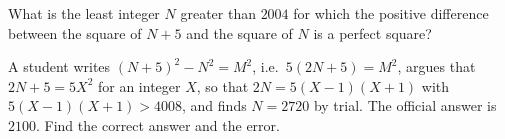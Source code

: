 What is the least integer $N$ greater than $2004$ for which the positive difference between the square of $N+5$ and the square of $N$ is a perfect square?

A student writes $(N+5)^2-N^2=M^2$, i.e.\ $5(2N+5)=M^2$, argues that $2N+5=5X^2$ for an integer $X$, so that $2N=5(X-1)(X+1)$ with $5(X-1)(X+1)>4008$, and finds $N=2720$ by trial. The official answer is $2100$. Find the correct answer and the error.
